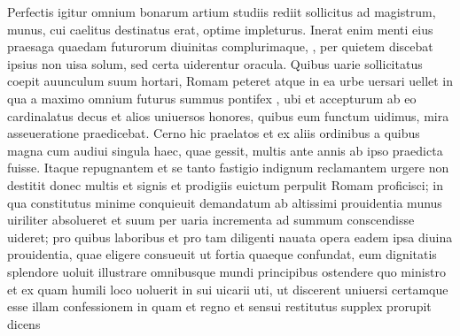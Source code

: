 \documentclass[a5paper,twoside]{article}
\begin{document}
Perfectis igitur  omnium bonarum artium studiis rediit sollicitus ad magistrum, munus, cui caelitus destinatus erat, optime impleturus.  Inerat enim menti eius praesaga quaedam futurorum diuinitas complurimaque,  , 
per quietem discebat ipsius non uisa solum, sed certa uiderentur oracula. Quibus uarie sollicitatus coepit auunculum suum hortari,    Romam peteret atque in ea urbe uersari uellet in qua a maximo omnium  futurus summus pontifex , ubi et  accepturum ab eo cardinalatus decus et alios uniuersos honores, quibus eum functum uidimus, mira asseueratione praedicebat. Cerno hic  praelatos et ex aliis ordinibus   a quibus magna cum  audiui singula haec, quae gessit, multis ante annis ab ipso praedicta fuisse.  Itaque repugnantem  et se tanto fastigio indignum reclamantem urgere non destitit donec multis et signis et prodigiis euictum perpulit Romam proficisci; in qua constitutus minime conquieuit  demandatum ab altissimi prouidentia munus uiriliter absolueret et  suum per uaria  incrementa ad summum  conscendisse uideret; pro quibus laboribus et pro tam diligenti nauata opera eadem ipsa diuina prouidentia, quae   eligere consueuit ut fortia quaeque confundat,  eum dignitatis splendore uoluit illustrare omnibusque mundi principibus ostendere quo ministro et ex quam humili loco  uoluerit in sui uicarii  uti, ut discerent uniuersi  certamque esse illam  confessionem in quam et regno et sensui restitutus supplex prorupit dicens 
\end{document}
